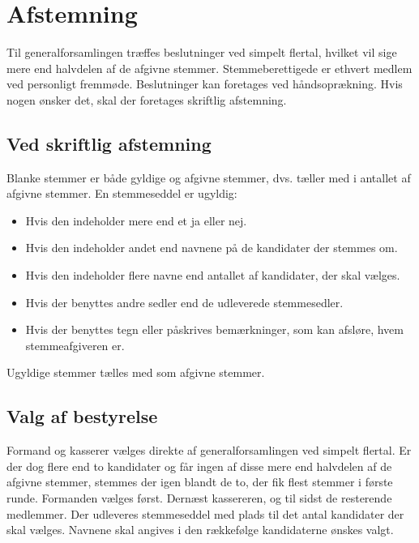 \documentclass[a4paper, 10pt]{article}
\begin{document}
\section{Afstemning}

Til generalforsamlingen træffes beslutninger ved simpelt flertal,
hvilket vil sige mere end halvdelen af de afgivne stemmer.
Stemmeberettigede er ethvert med\-lem ved personligt fremmøde.
Beslutninger kan foretages ved håndsoprækning. Hvis nogen ønsker det,
skal der foretages skriftlig afstemning.

\subsection*{Ved skriftlig afstemning}

Blanke stemmer er både gyldige og afgivne stemmer, dvs. tæller med i
antallet af afgivne stemmer. En stemmeseddel er ugyldig:

\begin{itemize}

\item Hvis den indeholder mere end et ja eller nej.

\item Hvis den indeholder andet end navnene på de kandidater der
stemmes om.

\item Hvis den indeholder flere navne end antallet af kandidater, der
skal væl\-ges.

\item Hvis der benyttes andre sedler end de udleverede stemmesedler.

\item Hvis der benyttes tegn eller påskrives bemærkninger, som kan
afsløre, hvem stemmeafgiveren er.

\end{itemize}

Ugyldige stemmer tælles med som afgivne stemmer.

\subsection*{Valg af bestyrelse}

Formand og kasserer vælges direkte af generalforsamlingen ved simpelt
flertal. Er der dog flere end to kandidater og får ingen af disse mere
end halvdelen af de afgivne stemmer, stemmes der igen blandt de to,
der fik flest stemmer i første runde. Formanden vælges først. Dernæst
kassereren, og til sidst de resterende medlemmer. Der udleveres
stemmeseddel med plads til det antal kandidater der skal vælges.
Navnene skal angives i den rækkefølge kandidaterne ønskes valgt.
\end{document}
